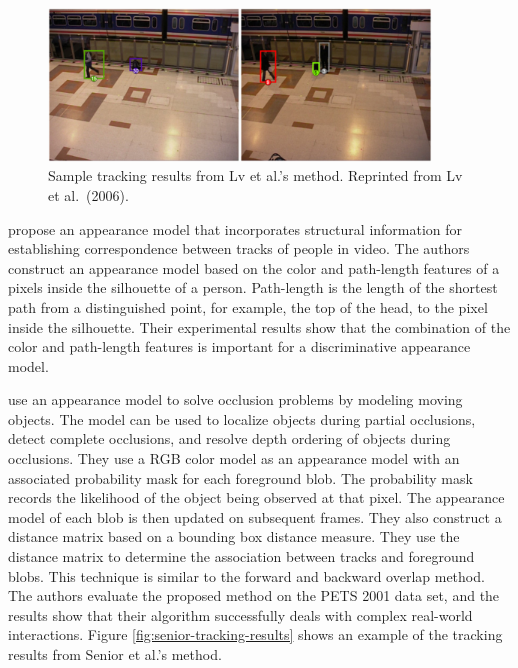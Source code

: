 \begin{figure}[t]
  \centering
  \includegraphics[width=4in]{figures/lv-blob-tracking-results.png}
  \caption[Sample tracking results from Lv et al.'s method.]{\small
    Sample tracking results from Lv et al.'s method. Reprinted from Lv
    et al.\ (2006).}
  \label{fig:lv-blob-tracking-results}
\end{figure}

 propose an appearance model that incorporates
structural information for establishing correspondence between tracks of people
in video. The authors construct an appearance model based on the color and
path-length features of a pixels inside the silhouette of a person.
Path-length is the length of the shortest path from a distinguished point, for
example, the top of the head, to the pixel inside the silhouette. Their
experimental results show that the combination of the color and path-length
features is important for a discriminative appearance model.

 use an appearance model to solve occlusion
problems by modeling moving objects. The model can be used to localize objects
during partial occlusions, detect complete occlusions, and resolve depth
ordering of objects during occlusions. They use a RGB color model as an
appearance model with an associated probability mask for each foreground blob.
The probability mask records the likelihood of the object being observed at
that pixel.  The appearance model of each blob is then updated on subsequent
frames. They also construct a distance matrix based on a bounding box distance
measure. They use the distance matrix to determine the association between
tracks and foreground blobs. This technique is similar to the forward and
backward overlap method.  The authors evaluate the proposed method on the PETS
2001 data set, and the results show that their algorithm successfully deals
with complex real-world interactions. Figure \ref{fig:senior-tracking-results}
shows an example of the tracking results from Senior et al.'s method.

